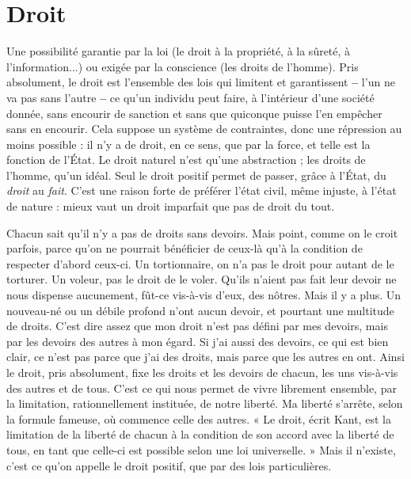 \section{Droit}
Une possibilité garantie par la loi (le droit à la propriété, à la sûreté,
à l'information...) ou exigée par la conscience (les droits de
l’homme). Pris absolument, le droit est l’ensemble des lois qui limitent et
garantissent {\bf --} l’un ne va pas sans l’autre {\bf --} ce qu’un individu peut faire, à l’intérieur
d’une société donnée, sans encourir de sanction et sans que quiconque
puisse l’en empêcher sans en encourir. Cela suppose un système de contraintes,
donc une répression au moins possible : il n’y a de droit, en ce sens, que par la
force, et telle est la fonction de l’État. Le droit naturel n’est qu’une abstraction ;
les droits de l’homme, qu’un idéal. Seul le droit positif permet de passer, grâce
à l’État, du {\it droit} au {\it fait}. C’est une raison forte de préférer l’état civil, même
injuste, à l’état de nature : mieux vaut un droit imparfait que pas de droit du
tout.

Chacun sait qu’il n’y a pas de droits sans devoirs. Mais point, comme on le
croit parfois, parce qu’on ne pourrait bénéficier de ceux-là qu’à la condition de
respecter d’abord ceux-ci. Un tortionnaire, on n’a pas le droit pour autant de le
torturer. Un voleur, pas le droit de le voler. Qu'ils n’aient pas fait leur devoir
ne nous dispense aucunement, fût-ce vis-à-vis d’eux, des nôtres. Mais il y a
plus. Un nouveau-né ou un débile profond n’ont aucun devoir, et pourtant
une multitude de droits. C’est dire assez que mon droit n’est pas défini par mes
devoirs, mais par les devoirs des autres à mon égard. Si j’ai aussi des devoirs, ce
qui est bien clair, ce n’est pas parce que j’ai des droits, mais parce que les autres
en ont. Ainsi le droit, pris absolument, fixe les droits et les devoirs de chacun,
les uns vis-à-vis des autres et de tous. C’est ce qui nous permet de vivre librement
ensemble, par la limitation, rationnellement instituée, de notre liberté.
Ma liberté s'arrête, selon la formule fameuse, où commence celle des autres.
« Le droit, écrit Kant, est la limitation de la liberté de chacun à la condition de
son accord avec la liberté de tous, en tant que celle-ci est possible selon une loi
universelle. » Mais il n’existe, c’est ce qu’on appelle le droit positif, que par des
lois particulières.

